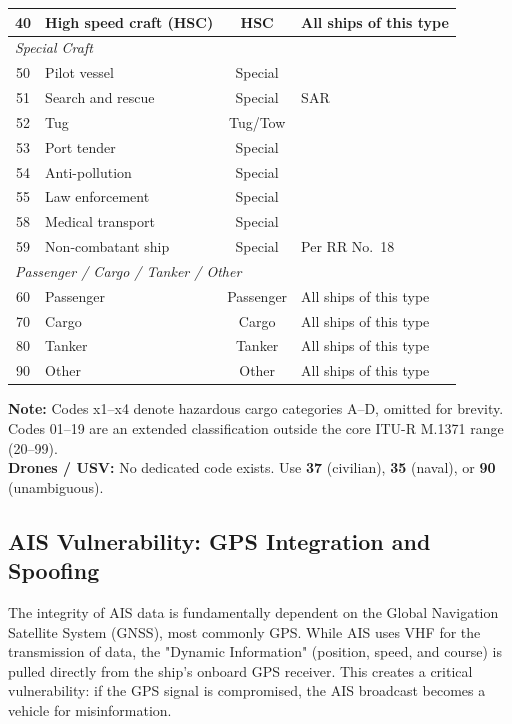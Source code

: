 \begin{longtable}{clcl}
\midrule
40  & High speed craft (HSC)    & HSC      & All ships of this type \\
\midrule
\multicolumn{4}{l}{\textit{Special Craft}} \\
\midrule
50  & Pilot vessel              & Special  & \\
51  & Search and rescue         & Special  & SAR \\
52  & Tug                       & Tug/Tow  & \\
53  & Port tender               & Special  & \\
54  & Anti-pollution            & Special  & \\
55  & Law enforcement           & Special  & \\
58  & Medical transport         & Special  & \\
59  & Non-combatant ship        & Special  & Per RR No.\ 18 \\
\midrule
\multicolumn{4}{l}{\textit{Passenger / Cargo / Tanker / Other}} \\
\midrule
60  & Passenger                 & Passenger & All ships of this type \\
70  & Cargo                     & Cargo     & All ships of this type \\
80  & Tanker                    & Tanker    & All ships of this type \\
90  & Other                     & Other     & All ships of this type \\

\end{longtable}

\noindent\textbf{Note:} Codes x1--x4 denote hazardous cargo categories A--D, omitted for brevity.
Codes 01--19 are an extended classification outside the core ITU-R M.1371 range (20--99).\\[4pt]
\noindent\textbf{Drones / USV:} No dedicated code exists.
Use \textbf{37} (civilian), \textbf{35} (naval), or \textbf{90} (unambiguous).




\subsection{AIS Vulnerability: GPS Integration and Spoofing}

The integrity of AIS data is fundamentally dependent on the Global Navigation Satellite System (GNSS), most commonly GPS. While AIS uses VHF for the transmission of data, the "Dynamic Information" (position, speed, and course) is pulled directly from the ship’s onboard GPS receiver. This creates a critical vulnerability: if the GPS signal is compromised, the AIS broadcast becomes a vehicle for misinformation.



